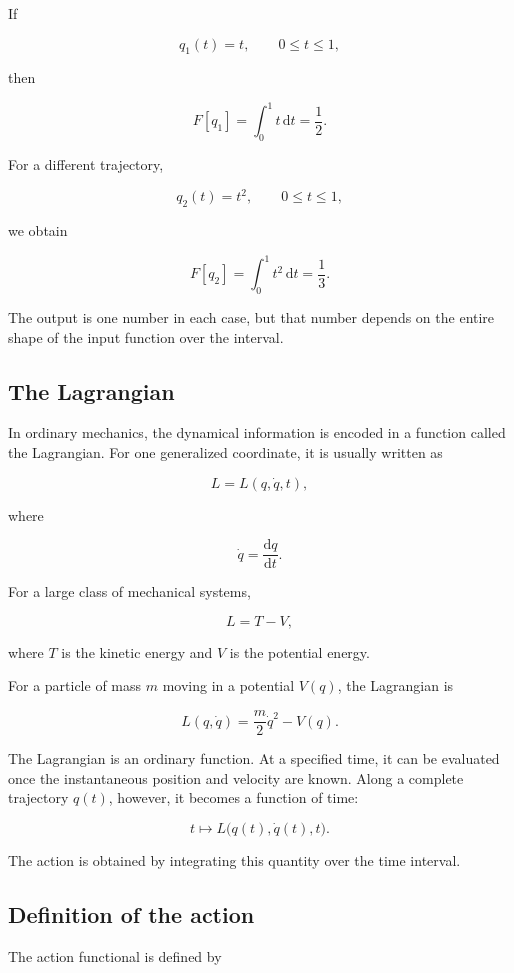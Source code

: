 If

\[
q_{1}(t)=t,
\qquad 0\leq t\leq 1,
\]

then

\[
F[q_{1}]
=
\int_{0}^{1} t\,\mathrm{d}t
=
\frac{1}{2}.
\]

For a different trajectory,

\[
q_{2}(t)=t^{2},
\qquad 0\leq t\leq 1,
\]

we obtain

\[
F[q_{2}]
=
\int_{0}^{1} t^{2}\,\mathrm{d}t
=
\frac{1}{3}.
\]

The output is one number in each case, but that number depends on the entire shape of the input function over the interval.

\subsection{The Lagrangian}

In ordinary mechanics, the dynamical information is encoded in a function called the Lagrangian. For one generalized coordinate, it is usually written as

\[
L=L(q,\dot q,t),
\]

where

\[
\dot q=\frac{\mathrm{d}q}{\mathrm{d}t}.
\]

For a large class of mechanical systems,

\[
L=T-V,
\]

where \(T\) is the kinetic energy and \(V\) is the potential energy.

For a particle of mass \(m\) moving in a potential \(V(q)\), the Lagrangian is

\[
L(q,\dot q)
=
\frac{m}{2}\dot q^{2}-V(q).
\]

The Lagrangian is an ordinary function. At a specified time, it can be evaluated once the instantaneous position and velocity are known. Along a complete trajectory \(q(t)\), however, it becomes a function of time:

\[
t\longmapsto L\bigl(q(t),\dot q(t),t\bigr).
\]

The action is obtained by integrating this quantity over the time interval.

\subsection{Definition of the action}

The action functional is defined by

